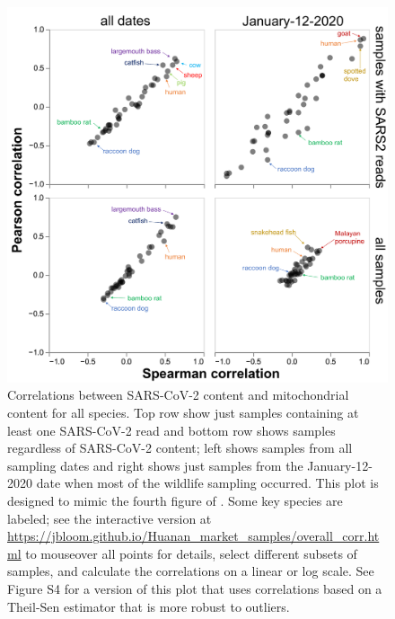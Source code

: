 \documentclass[9pt,twocolumn,twoside]{gsajnl_modified}
\begin{document}
\begin{figure}
\includegraphics[width=\linewidth]{fig4.pdf}
\caption{
Correlations between SARS-CoV-2 content and mitochondrial content for all species.
Top row show just samples containing at least one SARS-CoV-2 read and bottom row shows samples regardless of SARS-CoV-2 content; left shows samples from all sampling dates and right shows just samples from the January-12-2020 date when most of the wildlife sampling occurred.
This plot is designed to mimic the fourth figure of \citet{liu2022surveillance}.
Some key species are labeled; see the interactive version at \url{https://jbloom.github.io/Huanan_market_samples/overall_corr.html} to mouseover all points for details, select different subsets of samples, and calculate the correlations on a linear or log scale.
See Figure S4 for a version of this plot that uses correlations based on a Theil-Sen estimator that is more robust to outliers.
\label{fig:overall_corr}
}
\end{figure}
\end{document}
